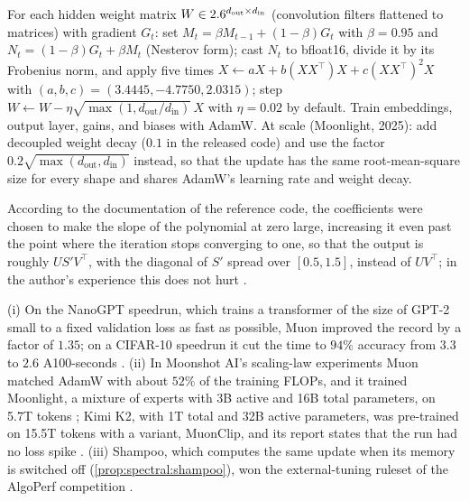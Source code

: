 \begin{refsection}
\begin{practice}
For each hidden weight matrix $W\in2.6^{d_{\mathrm{out}}\times d_{\mathrm{in}}}$ (convolution filters flattened to matrices) with gradient $G_t$: set $M_t=\beta M_{t-1}+(1-\beta)G_t$ with $\beta=0.95$ and $N_t=(1-\beta)G_t+\beta M_t$ (Nesterov form); cast $N_t$ to bfloat16, divide it by its Frobenius norm, and apply five times $X\leftarrow aX+b(XX^\top)X+c(XX^\top)^2X$ with $(a,b,c)=(3.4445,-4.7750,2.0315)$; step $W\leftarrow W-\eta\sqrt{\max(1,d_{\mathrm{out}}/d_{\mathrm{in}})}\,X$ with $\eta=0.02$ by default. Train embeddings, output layer, gains, and biases with AdamW. At scale (Moonlight, 2025): add decoupled weight decay ($0.1$ in the released code) and use the factor $0.2\sqrt{\max(d_{\mathrm{out}},d_{\mathrm{in}})}$ instead, so that the update has the same root-mean-square size for every shape and shares AdamW's learning rate and weight decay.
\end{practice}

According to the documentation of the reference code, the coefficients were chosen to make the slope of the polynomial at zero large, increasing it even past the point where the iteration stops converging to one, so that the output is roughly $US'V^\top$, with the diagonal of $S'$ spread over $[0.5,1.5]$, instead of $UV^\top$; in the author's experience this does not hurt \parencite{Jordan2024}.

\begin{observation}\label{obs:spectral:records}
(i) On the NanoGPT speedrun, which trains a transformer of the size of GPT-2 small to a fixed validation loss as fast as possible, Muon improved the record by a factor of $1.35$; on a CIFAR-10 speedrun it cut the time to $94\%$ accuracy from $3.3$ to $2.6$ A100-seconds \parencite{JordanEtAl2024Muon,Jordan2024}. (ii) In Moonshot AI's scaling-law experiments Muon matched AdamW with about $52\%$ of the training FLOPs, and it trained Moonlight, a mixture of experts with 3B active and 16B total parameters, on 5.7T tokens \parencite{LiuEtAl2025Muon}; Kimi K2, with 1T total and 32B active parameters, was pre-trained on 15.5T tokens with a variant, MuonClip, and its report states that the run had no loss spike \parencite{KimiTeam2025}. (iii) Shampoo, which computes the same update when its memory is switched off (\cref{prop:spectral:shampoo}), won the external-tuning ruleset of the AlgoPerf competition \parencite{KasimbegEtAl2025}.
\end{observation}


\end{refsection}
